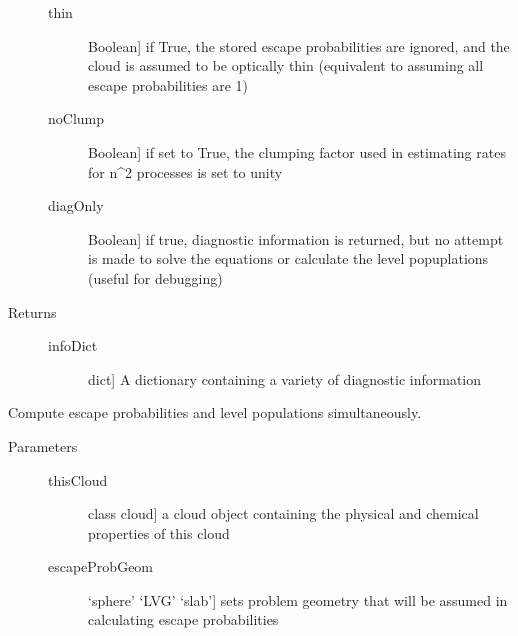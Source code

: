 \documentclass[letterpaper,10pt,english]{sphinxmanual}
\begin{document}
\begin{fulllineitems}
\begin{fulllineitems}
\begin{description}
\begin{description}
\item[{thin}] \leavevmode{[}Boolean{]}
if True, the stored escape probabilities are ignored, and
the cloud is assumed to be optically thin (equivalent to
assuming all escape probabilities are 1)

\item[{noClump}] \leavevmode{[}Boolean{]}
if set to True, the clumping factor used in estimating
rates for n\textasciicircum{}2 processes is set to unity

\item[{diagOnly}] \leavevmode{[}Boolean{]}
if true, diagnostic information is returned, but no
attempt is made to solve the equations or calculate the
level popuplations (useful for debugging)

\end{description}

\item[{Returns}] \leavevmode\begin{description}
\item[{infoDict}] \leavevmode{[}dict{]}
A dictionary containing a variety of diagnostic
information

\end{description}

\end{description}

\end{fulllineitems}


\begin{fulllineitems}
\label{fulldoc:despotic.emitter.setLevPopEscapeProb}
Compute escape probabilities and level populations
simultaneously.
\begin{description}
\item[{Parameters}] \leavevmode\begin{description}
\item[{thisCloud}] \leavevmode{[}class cloud{]}
a cloud object containing the physical and chemical
properties of this cloud

\item[{escapeProbGeom}] \leavevmode{[}`sphere' \textbar{} `LVG' \textbar{} `slab'{]}
sets problem geometry that will be assumed in calculating
escape probabilities


\end{description}
\end{description}
\end{fulllineitems}
\end{fulllineitems}
\end{document}
